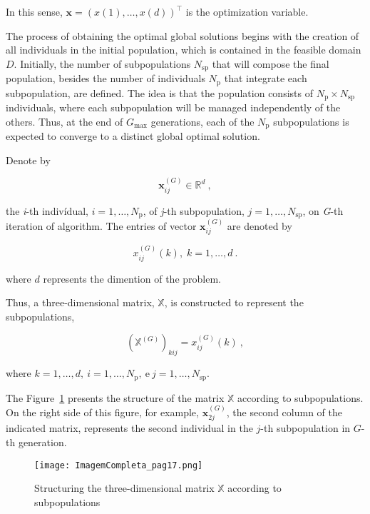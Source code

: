 \documentclass[smallextended]{svjour3}       %
\begin{document}
In this sense, $\boldsymbol{x} = (x(1), \dots, x(d))^{\top}$ is the optimization variable.

The process of obtaining the optimal global solutions begins with the creation of all individuals in the initial population, which is contained in the feasible domain $D$. Initially, the number of subpopulations $N_{\text{sp}}$ that will compose the final population, besides the number of individuals $N_{\text{p}}$ that integrate each subpopulation, are defined. The idea is that the population consists of $N_{\text{p}} \times N_{\text{sp}}$ individuals, where each subpopulation will be managed independently of the others. Thus, at the end of $ G_{\text{max}} $ generations, each of the $N_{\text{p}}$ subpopulations is expected to converge to a distinct global optimal solution.

Denote by

\begin{equation}
\boldsymbol{x}_{ij} ^{(G)} \in \mathbb{R}^{d} \: ,
\end{equation}

\noindent the \textit{i}-th indivídual, $i = 1, \dots, N_{\text{p}}$, of \textit{j}-th subpopulation, $j = 1, \dots, N_{\text{sp}}$, on \textit{G}-th iteration of algorithm. The entries of vector $\boldsymbol{x}_{ij} ^{(G)}$ are denoted by

\begin{equation}
x_{ij} ^{(G)} (k), \; k = 1, \dots, d \:.
\end{equation}

\noindent where $d$ represents the dimention of the problem.

Thus, a three-dimensional matrix, $\mathbb{X}$, is constructed to represent the subpopulations,

\begin{equation}
(\mathbb{X}^{(G)})_{kij} = x_{ij} ^{(G)}(k) \: , 
\label{eq:Xtridimensional}
\end{equation}

\noindent where $k = 1, \dots, d, \: i = 1, \dots, N_{\text{p}}, \: \text{e} \: j = 1, \dots, N_{\text{sp}}$.

The Figure~\ref{fig:matrizTridimensional_Xestruturada} presents the structure of the matrix $\mathbb{X}$ according to subpopulations. On the right side of this figure, for example, $ \boldsymbol{x}^{(G)} _{2 j} $, the second column of the indicated matrix, represents the second individual in the $ j $-th subpopulation in $G$-th generation.

\begin{figure}[!htb]
\texttt{[image: ImagemCompleta\_pag17.png]}
\caption{Structuring the three-dimensional matrix $ \mathbb{X} $ according to subpopulations}
\label{fig:matrizTridimensional_Xestruturada}
\end{figure}
\end{document}

